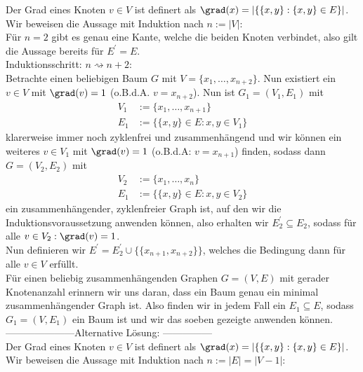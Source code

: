\begin{solution}
Der Grad eines Knoten $v \in V$
ist definert als $\grad(x) = |\{\{x,y\}: \{x,y\} \in E\}|$. \\
Wir beweisen die Aussage mit Induktion nach $n := |V|$: \\
Für $n = 2$ gibt es genau eine Kante, welche die beiden Knoten verbindet,
also gilt die Aussage bereits für $E^{\prime} = E$. \\
Induktionsschritt: $n \rightsquigarrow n + 2$: \\
Betrachte einen beliebigen Baum $G$ mit $V = \{x_1,\dots,x_{n+2}\}$.
Nun existiert ein $v \in V$ mit $\grad(v) = 1$ (o.B.d.A. $v = x_{n+2}$).
Nun ist $G_1 = (V_1,E_1)$ mit
\begin{align*}
  V_1 &:= \{x_1,\dots,x_{n+1}\} \\
  E_1 &:= \{\{x,y\} \in E: x,y \in V_1\}
\end{align*}
klarerweise immer noch zyklenfrei und zusammenhängend und wir können
ein weiteres $v \in V_1$ mit $\grad(v) = 1$ (o.B.d.A: $v = x_{n+1}$) finden, sodass
dann $G = (V_2,E_2)$ mit
\begin{align*}
  V_2 &:= \{x_1,\dots,x_{n}\} \\
    E_1 &:= \{\{x,y\} \in E: x,y \in V_2\}
\end{align*}
ein zusammenhängender, zyklenfreier Graph ist, auf den wir die Induktionsvoraussetzung
anwenden können, also erhalten wir $E_2^{\prime} \subseteq E_2$, sodass
für alle $v \in V_2: \grad(v) = 1$. \\
Nun definieren wir $E^{\prime} = E_2^{\prime} \cup \{\{x_{n+1},x_{n+2}\}\}$, welches
die Bedingung dann für alle $v \in V$ erfüllt. \\


Für einen beliebig zusammenhängenden Graphen $G = (V,E)$ mit gerader Knotenanzahl
erinnern wir uns daran, dass
ein Baum genau ein minimal zusammenhängender Graph ist.
Also finden wir in jedem Fall ein $E_1 \subseteq E$, sodass $G_1 = (V,E_1)$
ein Baum ist und wir das soeben gezeigte anwenden können.  \\


---------------------Alternative Lösung: ---------------\\

Der Grad eines Knoten $v \in V$
ist definert als $\grad(x) = |\{\{x,y\}: \{x,y\} \in E\}|$. \\
Wir beweisen die Aussage mit Induktion nach $n := |E| = |V-1|$: \\


\end{solution}
